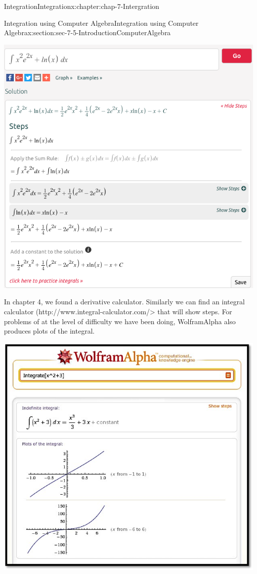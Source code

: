 \documentclass[oneside,10pt,]{book}
\numberwithin{equation}{section}
\begin{document}
\begin{chapterptx}{Integration}{}{Integration}{}{}{x:chapter:chap-7-Intergration}
\begin{sectionptx}{Integration using Computer Algebra}{}{Integration using Computer Algebra}{}{}{x:section:sec-7-5-IntroductionComputerAlgebra}
\begin{sidebyside}{1}{0.05}{0.05}{0}
\begin{sbspanel}{0.9}
\includegraphics[width=\linewidth]{images/sec7-5-9.png}
\end{sbspanel}%
\end{sidebyside}%
\par
In chapter 4, we found a derivative calculator.  Similarly we can find an integral calculator (http:\slash{}\slash{}www.integral-calculator.com\slash{}\textgreater{}  that will show steps. For problems of at the level of difficulty we have been doing, Wolfram\textbar{}Alpha also produces plots of the integral.%
\begin{sidebyside}{1}{0.05}{0.05}{0}%
\begin{sbspanel}{0.9}%
\includegraphics[width=\linewidth]{images/sec7-5-10.png}

\end{sbspanel}
\end{sidebyside}
\end{sectionptx}
\end{chapterptx}
\end{document}
